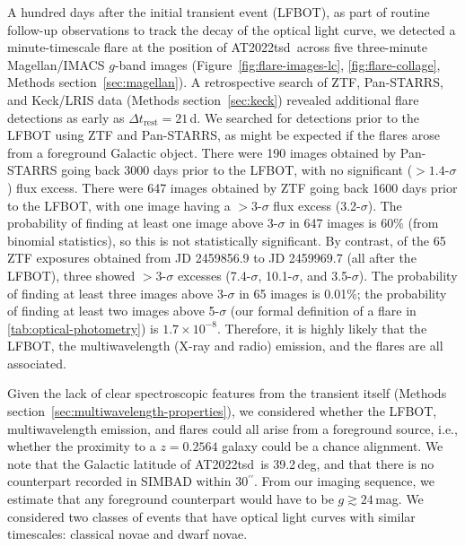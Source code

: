 \documentclass{nature_plusfigure}
\newcommand{\at}{AT2022tsd}
\newcommand{\arcsec}{$^{\prime\prime}$}
\begin{document}
\begin{methods}
A hundred days after the initial transient event (LFBOT), as part of routine follow-up observations to track the decay of the optical light curve, we detected\cite{Ho2022_Flares} a minute-timescale flare at the position of \at\ across five three-minute Magellan/IMACS $g$-band images (Figure~\ref{fig:flare-images-lc}, \ref{fig:flare-collage}, Methods section~\ref{sec:magellan}). A retrospective search of ZTF, Pan-STARRS, and Keck/LRIS data (Methods section~\ref{sec:keck}) revealed additional flare detections as early as $\Delta t_\mathrm{rest}=21\,$d. We searched for detections prior to the LFBOT using ZTF and Pan-STARRS, as might be expected if the flares arose from a foreground Galactic object. There were 190 images obtained by Pan-STARRS going back 3000 days prior to the LFBOT, with no significant ($>1.4$-$\sigma$) flux excess\cite{Fulton2022}. There were 647 images obtained by ZTF going back 1600 days prior to the LFBOT, with one image having a $>3$-$\sigma$ flux excess (3.2-$\sigma$). The probability of finding at least one image above 3-$\sigma$ in 647 images is 60\% (from binomial statistics), so this is not statistically significant. By contrast, of the 65 ZTF exposures obtained from JD 2459856.9 to JD 2459969.7 (all after the LFBOT), three showed $>3$-$\sigma$ excesses (7.4-$\sigma$, 10.1-$\sigma$, and 3.5-$\sigma$). The probability of finding at least three images above 3-$\sigma$ in 65 images is 0.01\%; the probability of finding at least two images above 5-$\sigma$ (our formal definition of a flare in \ref{tab:optical-photometry}) is $1.7\times10^{-8}$. Therefore, it is highly likely that the LFBOT, the multiwavelength (X-ray and radio) emission, and the flares are all associated. 


Given the lack of clear spectroscopic features from the transient itself (Methods section~\ref{sec:multiwavelength-properties}), we considered whether the LFBOT, multiwavelength emission, and flares could all arise from a foreground source, i.e., whether the proximity to a $z=0.2564$ galaxy could be a chance alignment. 
We note that the Galactic latitude of \at\ is 39.2\,deg, and that there is no counterpart recorded in SIMBAD within 30\arcsec. From our imaging sequence, we estimate that any foreground counterpart would have to be $g \gtrsim 24\,$mag. We considered two classes of events that have optical light curves with similar timescales: classical novae and dwarf novae.


\end{methods}
\end{document}
